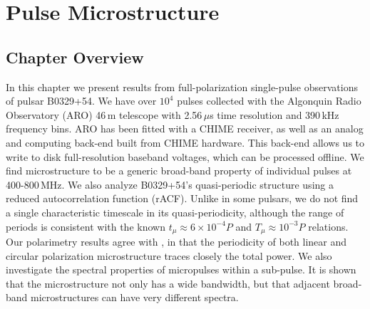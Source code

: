 \chapter{Pulse Microstructure}
\label{chapter:microstructure}



\section{Chapter Overview}
In this chapter we present results from full-polarization  
single-pulse observations of pulsar B0329+54. 
We have over $10^4$ pulses 
collected with the Algonquin Radio Observatory (ARO) 46\,m telescope
with 2.56\,$\mu$s time resolution and 390\,kHz 
frequency bins. ARO has been fitted with a CHIME 
receiver, as well as an analog and computing back-end built from 
CHIME hardware. This back-end allows us to write to disk 
full-resolution baseband voltages, which can be processed 
offline. 
We find microstructure to be a generic broad-band property of 
individual pulses at 400-800\,MHz. 
We also analyze B0329+54's quasi-periodic structure
using a reduced autocorrelation function (rACF). 
Unlike in some pulsars, 
we do not find a single characteristic timescale in its quasi-periodicity, 
although the range of periods is consistent with the known
$t_{\mu} \approx 6 \times 10^{-4} P$ and 
$T_{\mu} \approx 10^{-3} P$ relations. 
Our polarimetry results agree with 
\citet{2015ApJ...806..236M}, in that the periodicity 
of both linear and circular polarization microstructure 
traces closely the total power. 
We also investigate the spectral properties 
of micropulses within a sub-pulse. It is shown that the microstructure not 
only has a wide bandwidth, but that adjacent broad-band 
microstructures can have very different spectra. 


